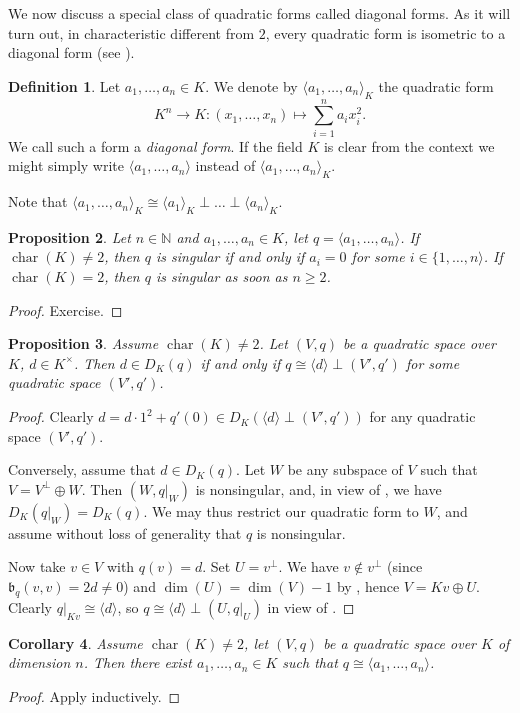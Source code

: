 \documentclass[12pt, leqno, british]{amsart}
\theoremstyle{definition}
\newtheorem{defi}{Definition}[subsection]
\theoremstyle{plain}
\newtheorem{prop}[defi]{Proposition}
\newtheorem{cor}[defi]{Corollary}
\theoremstyle{remark}
\newcommand{\mf}{\mathfrak}
\newcommand{\mbb}{\mathbb}
\newcommand{\nat}{\mbb N}
\DeclareMathOperator{\charac}{char}
\begin{document}
We now discuss a special class of quadratic forms called diagonal forms. As it will turn out, in characteristic different from $2$, every quadratic form is isometric to a diagonal form (see ).
\begin{defi}
Let $a_1, \ldots, a_n \in K$. We denote by $\langle a_1, \ldots, a_n \rangle_K$ the quadratic form
$$ K^n \to K : (x_1, \ldots, x_n) \mapsto \sum_{i=1}^n a_ix_i^2.$$
We call such a form a \emph{diagonal form}.
If the field $K$ is clear from the context we might simply write $\langle a_1, \ldots, a_n \rangle$ instead of $\langle a_1, \ldots, a_n \rangle_K$.
\end{defi}
Note that $\langle a_1, \ldots, a_n \rangle_K \cong \langle a_1 \rangle_K \perp \ldots \perp \langle a_n \rangle_K$.
\begin{prop}\label{P:diagforms-singular}
Let $n \in \nat$ and $a_1, \ldots, a_n \in K$, let $q = \langle a_1, \ldots, a_n \rangle$.
If $\charac(K) \neq 2$, then $q$ is singular if and only if $a_i = 0$ for some $i \in \lbrace 1, \ldots, n \rangle$.
If $\charac(K) = 2$, then $q$ is singular as soon as $n \geq 2$.
\end{prop}
\begin{proof}
Exercise.
\end{proof}
\begin{prop}\label{P:diagonalisation}
Assume $\charac(K) \neq 2$.
Let $(V, q)$ be a quadratic space over $K$, $d \in K^\times$.
Then $d \in D_K(q)$ if and only if $q \cong \langle d \rangle \perp (V', q')$ for some quadratic space $(V', q')$.
\end{prop}
\begin{proof}
Clearly $d = d \cdot 1^2 + q'(0) \in D_K(\langle d \rangle \perp (V', q'))$ for any quadratic space $(V', q')$.

Conversely, assume that $d \in D_K(q)$.
Let $W$ be any subspace of $V$ such that $V = V^\perp \oplus W$.
Then $(W, q\vert_W)$ is nonsingular, and, in view of , we have $D_K(q\vert_W) = D_K(q)$.
We may thus restrict our quadratic form to $W$, and assume without loss of generality that $q$ is nonsingular.

Now take $v \in V$ with $q(v) = d$.
Set $U = v^\perp$.
We have $v \not\in v^\perp$ (since $\mf{b}_q(v, v) = 2d \neq 0$) and $\dim(U) = \dim(V) - 1$ by , hence $V = Kv \oplus U$.
Clearly $q\vert_{Kv} \cong \langle d \rangle$, so $q \cong \langle d \rangle \perp (U, q\vert_U)$ in view of .
\end{proof}
\begin{cor}\label{C:diagonalisation}
Assume $\charac(K) \neq 2$, let $(V, q)$ be a quadratic space over $K$ of dimension $n$.
Then there exist $a_1, \ldots, a_n \in K$ such that $q \cong \langle a_1, \ldots, a_n \rangle$.
\end{cor}
\begin{proof}
Apply  inductively.
\end{proof}
\end{document}
